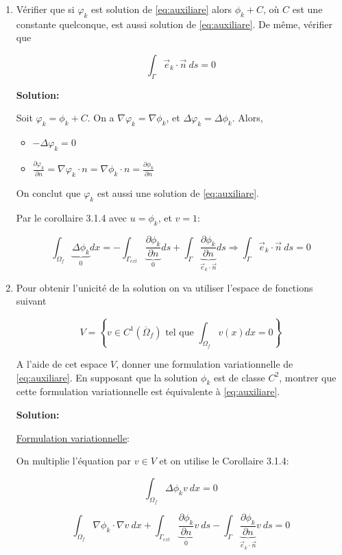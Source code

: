 \documentclass[10pt,a4paper,oneside]{article}
\begin{document}
\begin{enumerate}
\item
Vérifier que si $\varphi_k$ est solution de \eqref{eq:auxiliare} alors $\phi_k + C$, où $C$ est une constante quelconque, est aussi solution de \eqref{eq:auxiliare}. De même, vérifier que

\[ \int_\Gamma \vec{e}_k \cdot \vec{n}\ ds = 0 \]

\textbf{Solution:}

Soit $\varphi_k = \phi_k + C$. On a $\nabla \varphi_k = \nabla \phi_k$, et $\Delta \varphi_k = \Delta \phi_k$. Alors,

\begin{itemize}
\item
$-\Delta \varphi_k = 0$
\item
$\frac{\partial \varphi_k}{\partial n} = \nabla \varphi_k \cdot n = \nabla \phi_k \cdot n = \frac{\partial \phi_k}{\partial n}$
\end{itemize}

On conclut que $\varphi_k$ est aussi une solution de \eqref{eq:auxiliare}.

Par le corollaire 3.1.4 avec $u = \phi_k$, et $v = 1$:

\[ \int_{\Omega_f} \underbrace{\Delta \phi_k}_{0} dx = -\int_{\Gamma_{ext}} \underbrace{\frac{\partial \phi_k}{\partial n}}_{0} ds + \int_{\Gamma} \underbrace{\frac{\partial \phi_k}{\partial n}}_{\vec{e}_k \cdot \vec{n}} ds \Rightarrow \boxed{ \int_{\Gamma} \vec{e}_k \cdot \vec{n}\ ds = 0 } \]

\item
Pour obtenir l'unicité de la solution on va utiliser l'espace de fonctions suivant

\[ V = \left\lbrace v \in C^1(\overline{\Omega}_f) \text{ tel que } \int_{\Omega_f} v(x) dx = 0 \right\rbrace \]

A l'aide de cet espace $V$, donner une formulation variationnelle de \eqref{eq:auxiliare}. En supposant que la solution $\phi_k$ est de classe $C^2$, montrer que cette formulation variationnelle est équivalente à \eqref{eq:auxiliare}.

\textbf{Solution:}

\underline{Formulation variationnelle}:

On multiplie l'équation par $v \in V$ et on utilise le Corollaire 3.1.4:

\[ \int_{\Omega_f} \Delta \phi_k v\ dx = 0 \]

\[ \int_{\Omega_f} \nabla \phi_k \cdot \nabla v\ dx + \int_{\Gamma_{ext}} \underbrace{\frac{\partial \phi_k}{\partial n}}_{0} v\ ds - \int_{\Gamma} \underbrace{\frac{\partial \phi_k}{\partial n}}_{\vec{e}_k \cdot \vec{n}} v\ ds = 0 \]


\end{enumerate}
\end{document}
